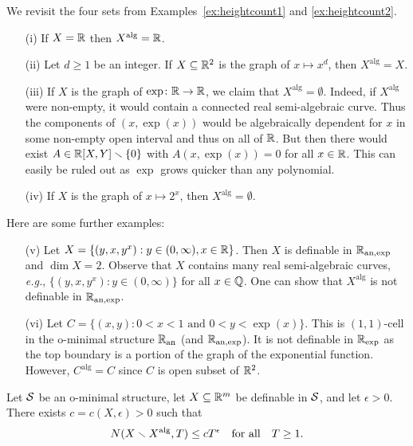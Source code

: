 \begin{example}
  We revisit the four sets from Examples~\ref{ex:heightcount1} and
  \ref{ex:heightcount2}.
  \begin{enumerate}
  \item [(i)] If $X={\mathbb{R}}$ then $X^{\mathrm{alg}}={\mathbb{R}}$.
  \item[(ii)] Let $d\ge 1$ be an integer. If
    $X\subseteq{\mathbb{R}}^2$ is the graph of $x\mapsto x^d$, then
    $X^{\mathrm{alg}}=X$.
  \item[(iii)] If $X$ is the graph of $\exp\colon{\mathbb{R}}\rightarrow{\mathbb{R}}$, we
    claim that $X^{\mathrm{alg}}=\emptyset$. Indeed, if
    $X^{\mathrm{alg}}$ were non-empty, it would contain a connected
    real semi-algebraic curve. Thus the components of $(x,\exp(x))$
    would be algebraically dependent for $x$ in some non-empty open
    interval and thus on all of ${\mathbb{R}}$. But then there would exist
    $A\in {\mathbb{R}}[X,Y]\smallsetminus\{0\}$ with $A(x,\exp(x))=0$ for all $x\in{\mathbb{R}}$.
    This can easily be ruled out as $\exp$
    grows quicker than any polynomial. 
    
  \item[(iv)] If $X$ is the graph of $x\mapsto 2^x$, then
    $X^{\mathrm{alg}}=\emptyset$.    
  \end{enumerate}
  Here are some further examples:
  \begin{enumerate}
  \item [(v)] Let $X = \{(y,x,y^x) : y\in (0,\infty), x\in{\mathbb{R}}\}$. Then
    $X$ is definable in ${{\mathbb{R}}_{\mathrm{an,exp}}}$ and $\dim X = 2$.
    Observe that $X$ contains many real semi-algebraic curves,
    \textit{e.g.}, $\{(y,x,y^x) : y\in (0,\infty)\}$ for all
    $x\in{\mathbb{Q}}$.
    One can show that $X^{\mathrm{alg}}$ is not definable in
    ${{\mathbb{R}}_{\mathrm{an,exp}}}$.

  \item[(vi)] Let $C = \{(x,y) : 0<x<1 \text{ and } 0<y<\exp(x) \}$.
    This is $(1,1)$-cell in the o-minimal structure ${{\mathbb{R}}_{\mathrm{an}}}$ (and
    ${{\mathbb{R}}_{\mathrm{an,exp}}}$). It is not definable in ${{\mathbb{R}}_{\mathrm{exp}}}$ as the top boundary
    is a portion of the graph of the exponential function. However,
    $C^{\mathrm{alg}}=C$ since $C$ is open subset of ${\mathbb{R}}^2$. 
  \end{enumerate}
\end{example}

\begin{theorem}
  \label{thm:pilawilkie}
  Let ${\mathcal S}$ be an o-minimal structure,  let $X\subseteq{\mathbb{R}}^m$ be
  definable in ${\mathcal S}$, and let $\epsilon >0$.
  There exists  $c=c(X,\epsilon)>0$ such that
  \begin{equation*}
    N(X\smallsetminus X^{\mathrm{alg}},T)\le c T^\epsilon \quad\text{for
      all}\quad T\ge 1.
  \end{equation*}
\end{theorem}

